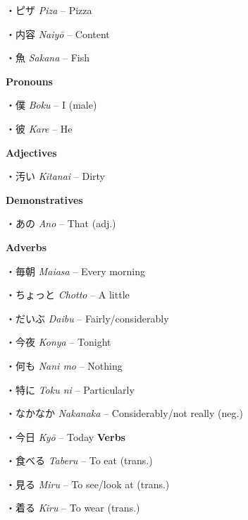 \par{・ピザ \emph{Piza }– Pizza }

\par{・内容 \emph{Naiyō }– Content }

\par{・魚 \emph{Sakana }– Fish }

\par{\textbf{Pronouns }}

\par{・僕 \emph{Boku }– I (male) }

\par{・彼 \emph{Kare }– He }

\par{\textbf{Adjectives }}

\par{・汚い \emph{Kitanai }– Dirty }

\par{\textbf{Demonstratives }}

\par{・あの \emph{Ano }– That (adj.) }

\par{\textbf{Adverbs }}

\par{・毎朝 \emph{Maiasa }– Every morning }

\par{・ちょっと \emph{Chotto }– A little }

\par{・だいぶ \emph{Daibu }– Fairly\slash considerably }

\par{・今夜 \emph{Kon\textquotesingle ya }– Tonight }

\par{・何も \emph{Nani mo }– Nothing }

\par{・特に \emph{Toku ni }– Particularly }

\par{・なかなか \emph{Nakanaka }– Considerably\slash not really (neg.) }

\par{・今日 \emph{Kyō }– Today }
 \textbf{Verbs }
\par{・食べる \emph{Taberu }– To eat (trans.) }

\par{・見る \emph{Miru }– To see\slash look at (trans.) }

\par{・着る \emph{Kiru }– To wear (trans.) }

